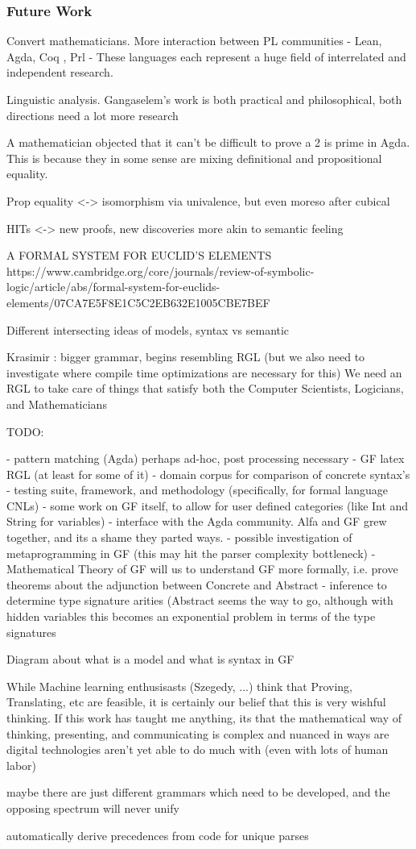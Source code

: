 \documentclass[10pt]{beamer}
\begin{document}
\begin{frame}
\frametitle{Future Work}

Convert mathematicians.
More interaction between PL communities - Lean, Agda, Coq , {Prl} -
These languages each represent a  huge field of interrelated and independent research.

Linguistic analysis.  Gangaselem's work is both practical and philosophical,
both directions need a lot more research

A mathematician objected that it can't be difficult to prove a 2 is prime in
Agda. This is because they in some sense are mixing definitional and
propositional equality.

Prop equality <-> isomorphism via univalence, but even moreso after cubical

HITs <-> new proofs, new discoveries more akin to semantic feeling

A FORMAL SYSTEM FOR EUCLID’S ELEMENTS
https://www.cambridge.org/core/journals/review-of-symbolic-logic/article/abs/formal-system-for-euclids-elements/07CA7E5F8E1C5C2EB632E1005CBE7BEF

Different intersecting ideas of models, syntax vs semantic

Krasimir : bigger grammar, begins resembling RGL
(but we also need to
investigate where compile time optimizations are necessary for this)
We need an RGL to take care of things that satisfy both the Computer Scientists,
Logicians, and Mathematicians

TODO:


- pattern matching (Agda) perhaps ad-hoc, post processing necessary
- GF latex RGL (at least for some of it)
- domain corpus for comparison of concrete syntax's
- testing suite, framework, and methodology (specifically, for formal language CNLs)
- some work on GF itself, to allow for user defined categories (like Int and
String for variables)
- interface with the Agda community.  Alfa and GF grew together, and its a shame
they parted ways.
- possible investigation of metaprogramming in GF (this may hit the parser
complexity bottleneck)
- Mathematical Theory of GF will us to understand GF more formally, i.e. prove
theorems about the adjunction between Concrete and Abstract
- inference to determine type signature arities (Abstract seems the way to go,
although with hidden variables this becomes an exponential problem in terms of
the type signatures

Diagram about what is a model and what is syntax in GF

While Machine learning enthusisasts (Szegedy, ...) think that Proving,
Translating, etc are feasible, it is certainly our belief that this is very
wishful thinking.  If this work has taught me anything, its that the
mathematical way of thinking, presenting, and communicating is complex and nuanced in ways
are digital technologies aren't yet able to do much with (even with lots of
human labor)

maybe there are just different grammars which need to be developed, and the
opposing spectrum will never unify

automatically derive precedences from code for unique parses

\end{frame}
\end{document}
